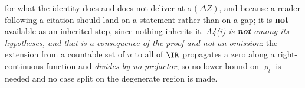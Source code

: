 \begin{lemma}
for what the identity does and does not deliver at $\sigma(\Delta Z)$, and because a reader following a
citation should land on a statement rather than on a gap; it is \textbf{not} available as an inherited
step, since nothing inherits it.
\emph{A4(i) is \textbf{not} among its hypotheses, and that is a consequence of the proof and not an
omission}: the extension from a countable set of $u$ to all of $\IR$ propagates a zero along a
right-continuous function and \emph{divides by no prefactor}, so no lower bound on $\varrho_l$ is needed
and no case split on the degenerate region is made.
\end{lemma}

%
%
%


